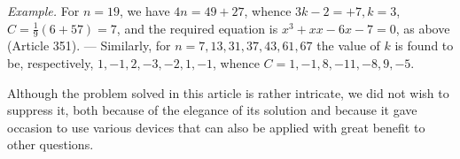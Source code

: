 \textit{Example.} For \(n=19\), we have \(4n=49+27\), whence \(3k-2=+7,\allowbreak k=3\), \(C=\frac19(6+57)=7\), and the required equation is \(x^3+xx-6x-7=0\), as above (Article 351). — Similarly, for \(n=7,\allowbreak 13,\allowbreak 31,\allowbreak 37,\allowbreak 43,\allowbreak 61,\allowbreak 67\) the value of \(k\) is found to be, respectively, \(1,\allowbreak -1,\allowbreak 2,\allowbreak -3,\allowbreak -2,\allowbreak 1,\allowbreak -1\), whence \(C=1,\allowbreak -1,\allowbreak 8,\allowbreak -11,\allowbreak -8,\allowbreak 9,\allowbreak -5\).

\clearpage
Although the problem solved in this article is rather intricate, we did not wish to suppress it, both because of the elegance of its solution and because it gave occasion to use various devices that can also be applied with great benefit to other questions.


